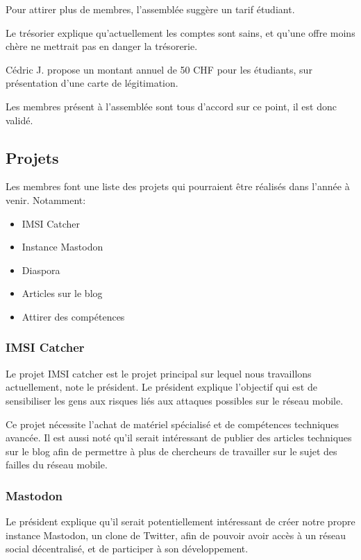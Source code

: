 \documentclass[12pt,twoside]{report}
\begin{document}
Pour attirer plus de membres, l'assemblée suggère un tarif étudiant. 

Le trésorier explique qu'actuellement les comptes sont sains, et qu'une offre moins chère ne mettrait pas en danger la trésorerie.

Cédric J. propose un montant annuel de 50 CHF pour les étudiants, sur présentation d'une carte de légitimation.

Les membres présent à l'assemblée sont tous d'accord sur ce point, il est donc validé.

\subsection*{Projets}

Les membres font une liste des projets qui pourraient être réalisés dans l'année à venir. Notamment:

\begin{itemize}
\item{IMSI Catcher}
\item{Instance Mastodon}
\item{Diaspora}
\item{Articles sur le blog}
\item{Attirer des compétences}
\end{itemize}

\subsubsection*{IMSI Catcher}

Le projet IMSI catcher est le projet principal sur lequel nous travaillons actuellement, note le président. Le président explique l'objectif qui est de sensibiliser les gens aux risques liés aux attaques possibles sur le réseau mobile.

Ce projet nécessite l'achat de matériel spécialisé et de compétences techniques avancée. Il est aussi noté qu'il serait intéressant de publier des articles techniques sur le blog afin de permettre à plus de chercheurs de travailler sur le sujet des failles du réseau mobile.

\subsubsection*{Mastodon}

Le président explique qu'il serait potentiellement intéressant de créer notre propre instance Mastodon, un clone de Twitter, afin de pouvoir avoir accès à un réseau social décentralisé, et de participer à son développement.
\end{document}
